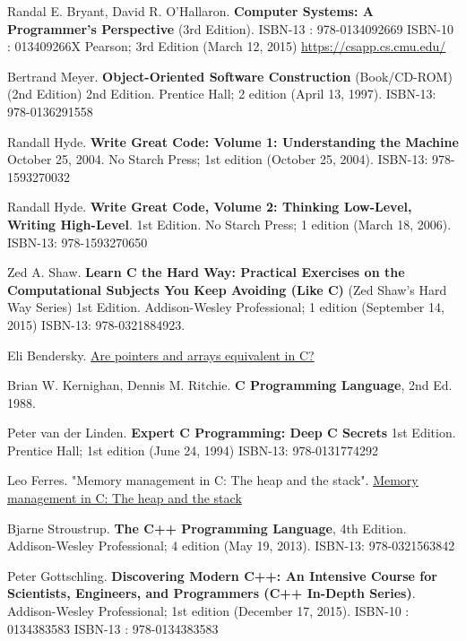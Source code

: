 \documentclass[10pt]{amsart}
\begin{document}
\begin{thebibliography}{9}

Randal E. Bryant, David R. O'Hallaron. \textbf{Computer Systems: A Programmer's Perspective} (3rd Edition). ISBN-13 : 978-0134092669
ISBN-10 : 013409266X
 Pearson; 3rd Edition (March 12, 2015) 
\url{https://csapp.cs.cmu.edu/}


Bertrand Meyer. \textbf{Object-Oriented Software Construction} (Book/CD-ROM) (2nd Edition) 2nd Edition.   Prentice Hall; 2 edition (April 13, 1997).  ISBN-13: 978-0136291558

Randall Hyde.  \textbf{Write Great Code: Volume 1: Understanding the Machine} October 25, 2004.  No Starch Press; 1st edition (October 25, 2004).  ISBN-13: 978-1593270032

Randall Hyde.  \textbf{Write Great Code, Volume 2: Thinking Low-Level, Writing High-Level}.   1st Edition.  No Starch Press; 1 edition (March 18, 2006).  ISBN-13: 978-1593270650

Zed A. Shaw.  \textbf{Learn C the Hard Way: Practical Exercises on the Computational Subjects You Keep Avoiding (Like C)} (Zed Shaw's Hard Way Series) 1st Edition.  Addison-Wesley Professional; 1 edition (September 14, 2015) ISBN-13: 978-0321884923.  

Eli Bendersky.   \href{https://eli.thegreenplace.net/2009/10/21/are-pointers-and-arrays-equivalent-in-c}{Are pointers and arrays equivalent in C?}

Brian W. Kernighan, Dennis M. Ritchie.  \textbf{C Programming Language}, 2nd Ed. 1988.   

Peter van der Linden.  \textbf{Expert C Programming: Deep C Secrets} 1st Edition.  Prentice Hall; 1st edition (June 24, 1994)  ISBN-13: 978-0131774292

Leo Ferres.  "Memory management in C: The heap and the stack".  \href{http://www.inf.udec.cl/~leo/teoX.pdf}{Memory management in C: The heap and the stack}


Bjarne Stroustrup.  \textbf{The C++ Programming Language}, 4th Edition. Addison-Wesley Professional; 4 edition (May 19, 2013).  ISBN-13: 978-0321563842

Peter Gottschling. \textbf{Discovering Modern C++: An Intensive Course for Scientists, Engineers, and Programmers (C++ In-Depth Series)}. Addison-Wesley Professional; 1st edition (December 17, 2015). ISBN-10 : 0134383583
ISBN-13 : 978-0134383583 


\end{thebibliography}
\end{document}
